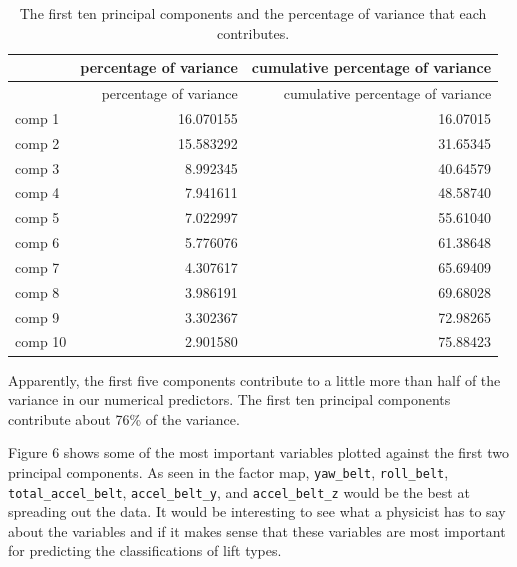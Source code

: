 \documentclass[12pt,twoside]{reedthesis}
\begin{document}
  \begin{longtable}[c]{@{}lrr@{}}
  \caption{The first ten principal components and the percentage of
  variance that each contributes.}\tabularnewline
  \toprule
  & percentage of variance & cumulative percentage of
  variance\tabularnewline
  \midrule
  \endfirsthead
  \toprule
  & percentage of variance & cumulative percentage of
  variance\tabularnewline
  \midrule
  \endhead
  comp 1 & 16.070155 & 16.07015\tabularnewline
  comp 2 & 15.583292 & 31.65345\tabularnewline
  comp 3 & 8.992345 & 40.64579\tabularnewline
  comp 4 & 7.941611 & 48.58740\tabularnewline
  comp 5 & 7.022997 & 55.61040\tabularnewline
  comp 6 & 5.776076 & 61.38648\tabularnewline
  comp 7 & 4.307617 & 65.69409\tabularnewline
  comp 8 & 3.986191 & 69.68028\tabularnewline
  comp 9 & 3.302367 & 72.98265\tabularnewline
  comp 10 & 2.901580 & 75.88423\tabularnewline
  \bottomrule
  \end{longtable}
  
  Apparently, the first five components contribute to a little more than
  half of the variance in our numerical predictors. The first ten
  principal components contribute about 76\% of the variance.
  
  Figure 6 shows some of the most important variables plotted against the
  first two principal components. As seen in the factor map,
  \texttt{yaw\_belt}, \texttt{roll\_belt}, \texttt{total\_accel\_belt},
  \texttt{accel\_belt\_y}, and \texttt{accel\_belt\_z} would be the best
  at spreading out the data. It would be interesting to see what a
  physicist has to say about the variables and if it makes sense that
  these variables are most important for predicting the classifications of
  lift types.
  
  \newpage
  
  \begin{Shaded}
  \begin{Highlighting}[]
   \NormalTok{, } \NormalTok{)}
  \end{Highlighting}
  \end{Shaded}
  
\end{document}
